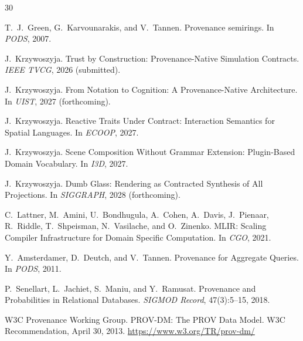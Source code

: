\documentclass[sigconf,nonacm]{acmart}
\begin{document}
\iffalse
\begin{thebibliography}{30}

T.~J.~Green, G.~Karvounarakis, and V.~Tannen.
\newblock Provenance semirings.
\newblock In \emph{PODS}, 2007.

J.~Krzywoszyja.
\newblock Trust by Construction: Provenance-Native Simulation Contracts.
\newblock \emph{IEEE TVCG}, 2026 (submitted).

J.~Krzywoszyja.
\newblock From Notation to Cognition: A Provenance-Native Architecture.
\newblock In \emph{UIST}, 2027 (forthcoming).

J.~Krzywoszyja.
\newblock Reactive Traits Under Contract: Interaction Semantics for Spatial Languages.
\newblock In \emph{ECOOP}, 2027.

J.~Krzywoszyja.
\newblock Scene Composition Without Grammar Extension: Plugin-Based Domain Vocabulary.
\newblock In \emph{I3D}, 2027.

J.~Krzywoszyja.
\newblock Dumb Glass: Rendering as Contracted Synthesis of All Projections.
\newblock In \emph{SIGGRAPH}, 2028 (forthcoming).

C.~Lattner, M.~Amini, U.~Bondhugula, A.~Cohen, A.~Davis,
J.~Pienaar, R.~Riddle, T.~Shpeisman, N.~Vasilache, and
O.~Zinenko.
\newblock MLIR: Scaling Compiler Infrastructure for Domain Specific
Computation.
\newblock In \emph{CGO}, 2021.

Y.~Amsterdamer, D.~Deutch, and V.~Tannen.
\newblock Provenance for Aggregate Queries.
\newblock In \emph{PODS}, 2011.

P.~Senellart, L.~Jachiet, S.~Maniu, and Y.~Ramusat.
\newblock Provenance and Probabilities in Relational Databases.
\newblock \emph{SIGMOD Record}, 47(3):5--15, 2018.

W3C Provenance Working Group.
\newblock PROV-DM: The PROV Data Model.
\newblock W3C Recommendation, April 30, 2013.
\newblock \url{https://www.w3.org/TR/prov-dm/}


\end{thebibliography}
\end{document}
